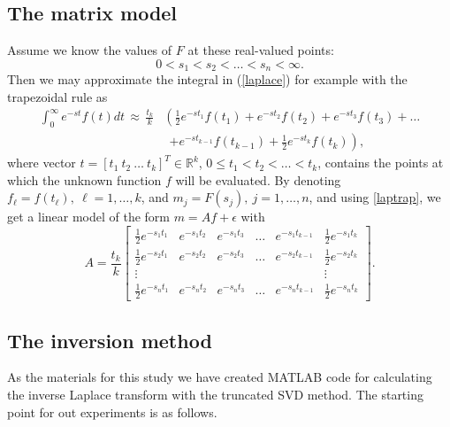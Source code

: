 \documentclass[12pt,a4]{article}
\newcommand{\R}{{\mathbb R}}
\begin{document}
\subsection{The matrix model}\label{sec:matrixmodel}

Assume we know the values of $F$ at these real-valued points:
$$
 0<s_1<s_2<\ldots <s_n<\infty.
$$ 
Then we may approximate the integral in (\ref{laplace}) for example with the trapezoidal rule as
\begin{equation} \label{laptrap}
\begin{split}
 \int_0^\infty e^{-st}f(t)dt\, \approx\, \frac{t_k}{k} & \left( \frac{1}{2}e^{-st_1}f(t_1)+e^{-st_2}f(t_2)+e^{-st_3}f(t_3)+\ldots\right.\\   &\ \ \left. +e^{-st_{k-1}}f(t_{k-1})+\frac{1}{2}e^{-st_k}f(t_k)\right) ,
\end{split}
\end{equation}
where vector $t=[t_1\ t_2\ \ldots\ t_k]^T\in\R^k$, $0\leq t_1<t_2<\ldots <t_k$, contains the points at which the unknown function $f$ will be evaluated. By denoting $f_\ell=f(t_\ell), \ \ell=1,\ldots ,k$, and $m_j=F(s_j),\ j=1,\ldots ,n$, and using \eqref{laptrap}, we get a linear model of the form $m=Af+\epsilon$ with
\begin{equation}\label{LaplaceA} 
A = \frac{t_k}{k}\begin{bmatrix} \frac{1}{2}e^{-s_1t_1} & e^{-s_1t_2} & e^{-s_1t_3} & \ldots & e^{-s_1t_{k-1}} & \frac{1}{2}e^{-s_1t_k} \\
                       \frac{1}{2}e^{-s_2t_1} & e^{-s_2t_2} & e^{-s_2t_3} & \ldots & e^{-s_2t_{k-1}} & \frac{1}{2}e^{-s_2t_k} \\
                       \vdots & & & & & \vdots \\
                       \frac{1}{2}e^{-s_nt_1} & e^{-s_nt_2} & e^{-s_nt_3} & \ldots & e^{-s_nt_{k-1}} & \frac{1}{2}e^{-s_nt_k} \end{bmatrix}.
\end{equation}


\subsection{The inversion method}
\label{sec:invmethod}

As the materials for this study we have created MATLAB code for calculating the inverse Laplace transform with the truncated SVD method. The starting point for out experiments is as follows.
\end{document}

